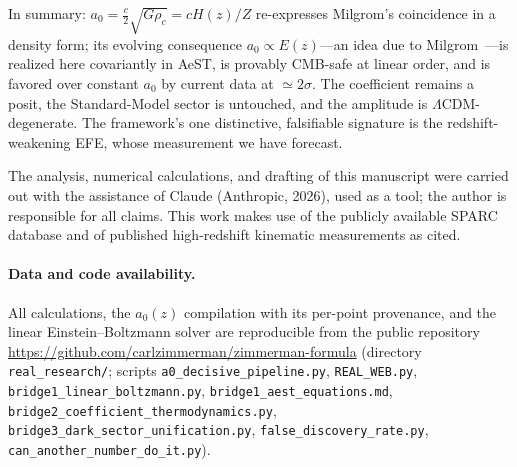\documentclass[aps,prd,preprint,nofootinbib,floatfix]{revtex4-2}
\begin{document}
In summary: $a_0=\tfrac{c}{2}\sqrt{G\rho_c}=cH(z)/Z$ re-expresses Milgrom's
coincidence in a density form; its evolving consequence $a_0\propto E(z)$---an idea
due to Milgrom~\cite{Milgrom2014}---is realized here covariantly in AeST, is provably
CMB-safe at linear order, and is favored over constant $a_0$ by current data at
$\simeq2\sigma$. The coefficient remains a posit, the Standard-Model sector is
untouched, and the amplitude is $\Lambda$CDM-degenerate. The framework's one
distinctive, falsifiable signature is the redshift-weakening EFE, whose measurement we
have forecast.

\begin{acknowledgments}
The analysis, numerical calculations, and drafting of this manuscript were carried
out with the assistance of Claude (Anthropic, 2026), used as a tool; the author is
responsible for all claims. This work makes use of the publicly available SPARC
database and of published high-redshift kinematic measurements as cited.
\end{acknowledgments}

\paragraph*{Data and code availability.}
All calculations, the $a_0(z)$ compilation with its per-point provenance, and the
linear Einstein--Boltzmann solver are reproducible from the public repository
\url{https://github.com/carlzimmerman/zimmerman-formula} (directory
\texttt{real\_research/}; scripts \texttt{a0\_decisive\_pipeline.py},
\texttt{REAL\_WEB.py}, \texttt{bridge1\_linear\_boltzmann.py},
\texttt{bridge1\_aest\_equations.md},
\texttt{bridge2\_coefficient\_thermodynamics.py},
\texttt{bridge3\_dark\_sector\_unification.py},
\texttt{false\_discovery\_rate.py}, \texttt{can\_another\_number\_do\_it.py}).
\end{document}
